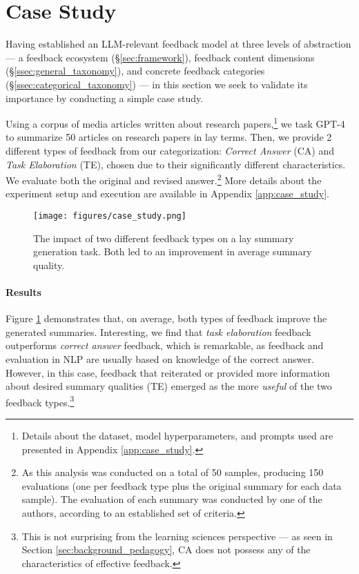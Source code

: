 \section{Case Study}
\label{sec:case_study}

Having established an LLM-relevant feedback model at three levels of abstraction --- a feedback ecosystem (\S\ref{sec:framework}), feedback content dimensions (\S\ref{ssec:general_taxonomy}), and concrete feedback categories (\S\ref{ssec:categorical_taxonomy}) --- in this section we seek to validate its importance by conducting a simple case study.

Using a corpus of media articles written about research papers,\footnote{Details about the dataset, model hyperparameters, and prompts used are presented in Appendix \ref{app:case_study}.} we task GPT-4 \citep{openai2023gpt4} to summarize 50 articles on research papers in lay terms. Then, we provide 2 different types of feedback from our categorization: 
\textit{Correct Answer} (CA) and \textit{Task Elaboration} (TE), chosen due to their significantly different characteristics. We evaluate both the original and revised answer.\footnote{As this analysis was conducted on a total of 50 samples, producing 150 evaluations (one per feedback type plus the original summary for each data sample). The evaluation of each summary was conducted by one of the authors, according to an established set of criteria.} More details about the experiment setup and execution are available in Appendix \ref{app:case_study}.

\begin{figure}[t]
\centering
\texttt{[image: figures/case\_study.png]}
\caption{The impact of two different feedback types on a lay summary generation task. Both led to an improvement in average summary quality.}
\label{fig:case_study}
\end{figure}

\paragraph{Results} Figure \ref{fig:case_study} demonstrates that, on average, both types of feedback improve the generated summaries. Interesting, we find that \textit{task elaboration} feedback outperforms \textit{correct answer} feedback, which is remarkable, as feedback and evaluation in NLP are usually based on knowledge of the correct answer. However, in this case, feedback that reiterated or provided more information about desired summary qualities (\ie TE) emerged as the more \textit{useful} of the two feedback types.\footnote{This is not surprising from the learning sciences perspective --- as seen in Section \ref{sec:background_pedagogy}, CA does not possess any of the characteristics of effective feedback.}

